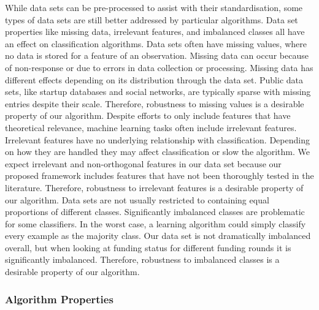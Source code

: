 \documentclass[../thesis/thesis.tex]{subfiles}
\begin{document}
\begin{refsection}
While data sets can be pre-processed to assist with their standardisation, some types of data sets are still better addressed by particular algorithms. Data set properties like missing data, irrelevant features, and imbalanced classes all have an effect on classification algorithms. Data sets often have missing values, where no data is stored for a feature of an observation. Missing data can occur because of non-response or due to errors in data collection or processing. Missing data has different effects depending on its distribution through the data set. Public data sets, like startup databases and social networks, are typically sparse with missing entries despite their scale. Therefore, robustness to missing values is a desirable property of our algorithm. Despite efforts to only include features that have theoretical relevance, machine learning tasks often include irrelevant features. Irrelevant features have no underlying relationship with classification. Depending on how they are handled they may affect classification or slow the algorithm. We expect irrelevant and non-orthogonal features in our data set because our proposed framework includes features that have not been thoroughly tested in the literature. Therefore, robustness to irrelevant features is a desirable property of our algorithm. Data sets are not usually restricted to containing equal proportions of different classes. Significantly imbalanced classes are problematic for some classifiers. In the worst case, a learning algorithm could simply classify every example as the majority class. Our data set is not dramatically imbalanced overall, but when looking at funding status for different funding rounds it is significantly imbalanced. Therefore, robustness to imbalanced classes is a desirable property of our algorithm.

\subsubsection{Algorithm Properties}


\end{refsection}
\end{document}
